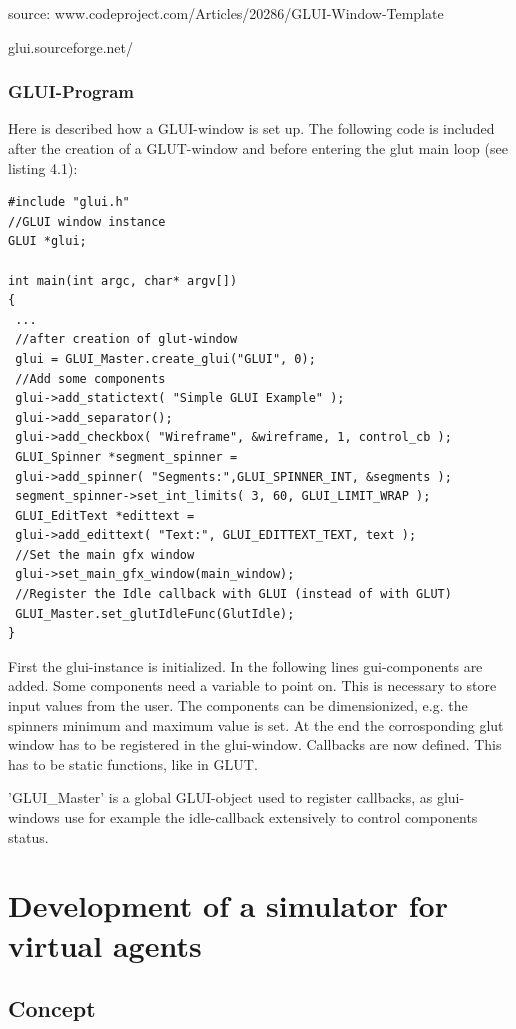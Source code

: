 \documentclass[10pt,a4paper,DIV=11]{scrreprt}
\begin{document}
source: www.codeproject.com/Articles/20286/GLUI-Window-Template

glui.sourceforge.net/


\subsection{GLUI-Program}

Here is described how a GLUI-window is set up.
The following code is included after the creation of a GLUT-window and before entering the glut main loop (see listing 4.1):


\begin{lstlisting}[caption={Creating a GLUI-window},label=lst:glui-create]
#include "glui.h"
//GLUI window instance
GLUI *glui;

int main(int argc, char* argv[])
{
 ...
 //after creation of glut-window
 glui = GLUI_Master.create_glui("GLUI", 0);
 //Add some components
 glui->add_statictext( "Simple GLUI Example" );
 glui->add_separator();
 glui->add_checkbox( "Wireframe", &wireframe, 1, control_cb );
 GLUI_Spinner *segment_spinner =
 glui->add_spinner( "Segments:",GLUI_SPINNER_INT, &segments );
 segment_spinner->set_int_limits( 3, 60, GLUI_LIMIT_WRAP );
 GLUI_EditText *edittext =
 glui->add_edittext( "Text:", GLUI_EDITTEXT_TEXT, text );
 //Set the main gfx window
 glui->set_main_gfx_window(main_window);
 //Register the Idle callback with GLUI (instead of with GLUT)
 GLUI_Master.set_glutIdleFunc(GlutIdle);
}
\end{lstlisting}

First the glui-instance is initialized. In the following lines gui-components are added. Some components need a variable to point on. This is necessary to store input values from the user. The components can be dimensionized, e.g. the spinners minimum and maximum value is set.
At the end the corrosponding glut window has to be registered in the glui-window.
Callbacks are now defined. This has to be static functions, like in GLUT.

'GLUI\_Master' is a global GLUI-object used to register callbacks, as glui-windows use for example the idle-callback extensively to control components status.

\chapter{Development of a simulator for virtual agents}

\section{Concept}
\end{document}
